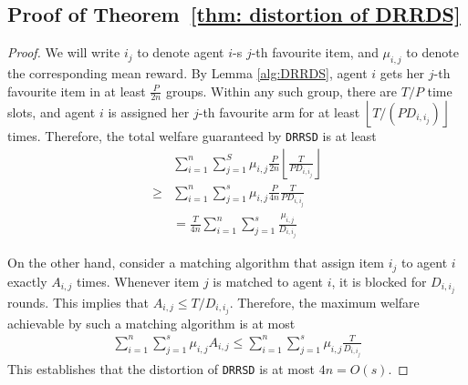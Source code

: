 \documentclass[letterpaper,11pt]{article}
\begin{document}
\subsection{Proof of Theorem~\ref{thm: distortion of DRRDS}}
\begin{proof}
We will write $i_j$ to denote agent $i$-s $j$-th favourite item, and $\mu_{i, j}$ to denote the corresponding mean reward. By Lemma \ref{alg:DRRDS}, agent $i$ gets her $j$-th favourite item in at least $\frac{P}{2n}$ groups. Within any such group,  there are $T/P$ time slots, and agent $i$ is assigned her $j$-th favourite arm for at least $\left \lfloor T/(PD_{i,i_j}) \right \rfloor$ times. Therefore, the total welfare guaranteed by \texttt{DRRSD} is at least
\begin{align*}
&\sum_{i=1}^n \sum_{j=1}^S \mu_{i,j} \frac{P}{2n} \left \lfloor \frac{T}{PD_{i,i_j}} \right \rfloor\\ \ge &\sum_{i=1}^n \sum_{j=1}^s \mu_{i, j}\frac{P}{4n}  \frac{T}{PD_{i,i_j}} \\ &= \frac{T}{4n} \sum_{i=1}^n \sum_{j=1}^s \frac{\mu_{i, j}}{D_{i,i_j}}
\end{align*}

On the other hand, consider a matching algorithm that assign item $i_j$ to agent $i$ exactly $A_{i,j}$ times. Whenever item $j$ is matched to agent $i$, it is blocked for $D_{i,i_j}$ rounds. This implies that $A_{i,j} \le T/D_{i,i_j}$. Therefore, the maximum welfare achievable by such a matching algorithm is at most
    \begin{align*}
        \sum_{i=1}^n \sum_{j=1}^s \mu_{i, j} A_{i,j} \le \sum_{i=1}^n \sum_{j=1}^s \mu_{i,j} \frac{T}{D_{i,i_j}}
    \end{align*}
    This establishes that the distortion of \texttt{DRRSD} is at most $4n = O(s)$.
\end{proof}
\fi
\end{document}

